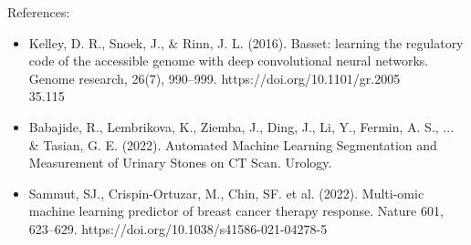 \documentclass{article}
\begin{document}
References:
\begin{itemize}
    \item Kelley, D. R., Snoek, J., \& Rinn, J. L. (2016). Basset: learning the regulatory code of the accessible genome with deep convolutional neural networks. Genome research, 26(7), 990–999. https://doi.org/10.1101/gr.2005\\35.115
    \item Babajide, R., Lembrikova, K., Ziemba, J., Ding, J., Li, Y., Fermin, A. S., ... \& Tasian, G. E. (2022). Automated Machine Learning Segmentation and Measurement of Urinary Stones on CT Scan. Urology.
    \item Sammut, SJ., Crispin-Ortuzar, M., Chin, SF. et al.  (2022). Multi-omic machine learning predictor of breast cancer therapy response. Nature 601, 623–629. https://doi.org/10.1038/s41586-021-04278-5
\end{itemize}
\end{document}
